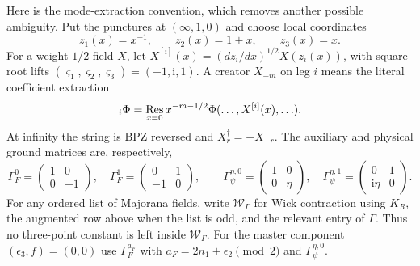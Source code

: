 \documentclass[11pt]{article}
\newcommand{\eps}{\epsilon}
\newcommand{\ii}{\mathrm i}
\begin{document}
Here is the mode-extraction convention, which removes another possible
ambiguity.  Put the punctures at $(\infty,1,0)$ and choose local coordinates
\begin{equation}
 z_1(x)=x^{-1},\qquad z_2(x)=1+x,\qquad z_3(x)=x.
 \label{eq:local-coordinates}
\end{equation}
For a weight-$1/2$ field $X$, let
$X^{[i]}(x)=(dz_i/dx)^{1/2}X(z_i(x))$, with square-root lifts
$(\varsigma_1,\varsigma_2,\varsigma_3)=(-1,\ii,1)$.  A creator $X_{-m}$ on
leg $i$ means the literal coefficient extraction
\begin{equation}
 [X_{-m}]_i\Phi=\mathop{\rm Res}_{x=0}
 x^{-m-1/2}\Phi(\ldots,X^{[i]}(x),\ldots).
 \label{eq:mode-extraction}
\end{equation}
At infinity the string is BPZ reversed and $X_r^\dagger=-X_{-r}$.
The auxiliary and physical ground matrices are, respectively,
\begin{equation}
 \Gamma_F^{0}=\begin{pmatrix}1&0\\0&-1\end{pmatrix},\quad
 \Gamma_F^{1}=\begin{pmatrix}0&1\\-1&0\end{pmatrix},\qquad
 \Gamma_\psi^{\eta,0}=\begin{pmatrix}1&0\\0&\eta\end{pmatrix},\quad
 \Gamma_\psi^{\eta,1}=\begin{pmatrix}0&1\\\ii\eta&0\end{pmatrix}.
 \label{eq:ground-matrices}
\end{equation}
For any ordered list of Majorana fields, write
$\mathcal W_\Gamma$ for Wick contraction using $K_R$, the augmented row
above when the list is odd, and the relevant entry of $\Gamma$.  Thus no
three-point constant is left inside $\mathcal W_\Gamma$.  For the master
component $(\eps_3,f)=(0,0)$ use
$\Gamma_F^{a_F}$ with $a_F=2n_1+\eps_2\pmod2$ and
$\Gamma_\psi^{\eta,0}$.
\end{document}
